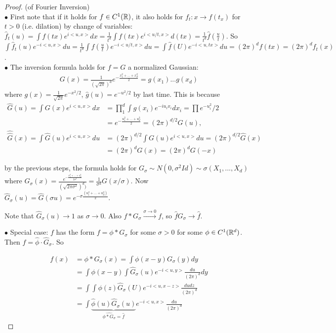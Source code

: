 \documentclass[a4paper]{article}
\begin{document}
\begin{proof} (of Fourier Inversion)\\
$\bullet$ First note that if it holds for $f \in C^1(\mathbb{R})$, it also holds for $f_t: x \to f(t_x)$ for $t>0$ (i.e. dilation) by change of variables: $\hat{f}_t(u) = \int f(tx) e^{i<u,x>} dx = \frac{1}{t^d} \int f(tx) e^{i<u/t,x>} d(tx) = \frac{1}{t^d} \hat{f} (\frac{u}{t})$. So $\int \hat{f}_t(u) e^{-i<u,x>} du = \frac{1}{t^d} \int \hat{f} (\frac{u}{t}) e^{-i<u/t,x>} du = \int \hat{f} (U) e^{-i<u,tx>} du = (2\pi)^d f(tx) = (2\pi)^d f_t(x)$.\\
$\bullet$ The inversion formula holds for $f=G$ a normalized Gaussian:
\begin{equation*}
\begin{aligned}
G(x) = \frac{1}{(\sqrt{2\pi})^d} e^{-\frac{x_1^2+...+x_d^2}{2}} = g(x_1)...g(x_d)
\end{aligned}
\end{equation*}
where $g(x) = \frac{1}{\sqrt{2\pi}} e^{-x^2/2}$, $\hat{g}(u) = e^{-u^2/2}$ by last time. This is because
\begin{equation*}
\begin{aligned}
\hat{G}(u) =\int G(x) e^{i<u,x>} dx &= \prod_1^d \int g(x_i) e^{-iu_ix_i} dx_i = \prod e^{-u_i^2}/2\\
&= e^{-\frac{u_1^2+...+u_d^2}{2}} = (2\pi)^{d/2} G(u),\\
\hat{\hat{G}}(x) = \int \hat{G}(u) e^{i<u,x>} du &= (2\pi)^{d/2} \int G(u) e^{i<u,x>} du = (2\pi)^{d/2} \hat{G}(x)\\
&= (2\pi)^d G(x) = (2\pi)^d G(-x)
\end{aligned}
\end{equation*}

by the previous steps, the formula holds for $G_\sigma \sim N(0,\sigma^2Id) \sim \sigma(X_1,...,X_d)$ where $G_\sigma(x) = \frac{e^{-\frac{x_1^2+...+x_d^2}{2\sigma^2}}}{(\sqrt{2\pi\sigma^2})^d)} = \frac{1}{\sigma^d}G(x/\sigma)$. Now $\hat{G}_\sigma(u) = \hat{G}(\sigma u) = e^{-\sigma \frac{(u_1^2+...+u_d^2)}{2}}$.

Note that $\hat{G}_\sigma(u) \to 1$ as $\sigma \to 0$. Also $f*G_\sigma \xrightarrow{\sigma \to 0} f$, so $\hat{f} \hat{G}_\sigma \to \hat{f}$.

$\bullet$ Special case: $f$ has the form $f = \phi*G_\sigma$ for some $\sigma >0$ for some $\phi \in C^1(\mathbb{R}^d)$. Then $\hat{f} = \hat{\phi} \cdot \hat{G}_\sigma$. So

\begin{equation*}
\begin{aligned}
f(x) &= \phi*G_\sigma(x) = \int \phi(x-y) G_\sigma(y) dy\\
&= \int \phi(x-y) \int \hat{G}_\sigma(u) e^{-i<u,y>} \frac{du}{(2\pi)^d}dy\\
&= \int \int \phi(z) \hat{G}_\sigma(U) e^{-i<u,x-z>} \frac{dudz}{(2\pi)^d}\\
&= \int \underbrace{\hat{\phi}(u) \hat{G}_\sigma(u)}_{\hat{\phi*G_\sigma} = \hat{f}} e^{-i<u,x>} \frac{du}{(2\pi)^d}
\end{aligned}
\end{equation*}


\end{proof}
\end{document}
